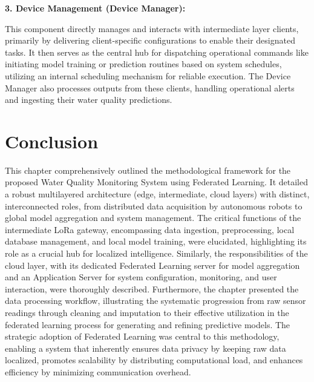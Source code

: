 \textbf{3. Device Management (Device Manager):}

This component directly manages and interacts with intermediate layer clients, primarily by delivering client-specific configurations to enable their designated tasks. It then serves as the central hub for dispatching operational commands like initiating model training or prediction routines based on system schedules, utilizing an internal scheduling mechanism for reliable execution. The Device Manager also processes outputs from these clients, handling operational alerts and ingesting their water quality predictions.

\newpage

\section*{Conclusion}
This chapter comprehensively outlined the methodological framework for the proposed Water Quality Monitoring System using Federated Learning. It detailed a robust multilayered architecture (edge, intermediate, cloud layers) with distinct, interconnected roles, from distributed data acquisition by autonomous robots to global model aggregation and system management. The critical functions of the intermediate LoRa gateway, encompassing data ingestion, preprocessing, local database management, and local model training, were elucidated, highlighting its role as a crucial hub for localized intelligence. Similarly, the responsibilities of the cloud layer, with its dedicated Federated Learning server for model aggregation and an Application Server for system configuration, monitoring, and user interaction, were thoroughly described. Furthermore, the chapter presented the data processing workflow, illustrating the systematic progression from raw sensor readings through cleaning and imputation to their effective utilization in the federated learning process for generating and refining predictive models. The strategic adoption of Federated Learning was central to this methodology, enabling a system that inherently ensures data privacy by keeping raw data localized, promotes scalability by distributing computational load, and enhances efficiency by minimizing communication overhead.

\pagebreak